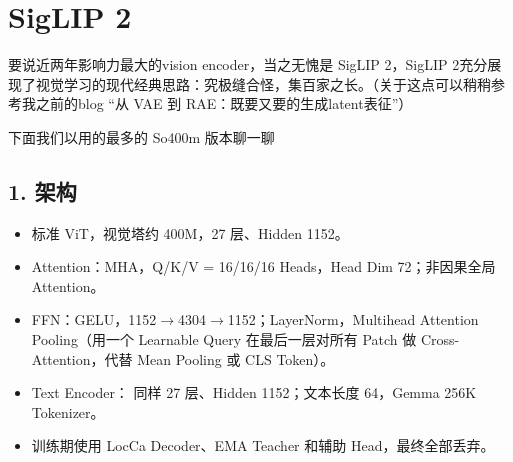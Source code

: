 \clearpage
{}
\setlength{\paperwidth}{210mm}
\setlength{\paperheight}{297mm}
\setlength{\pdfpagewidth}{210mm}
\setlength{\pdfpageheight}{297mm}
\fancyhfoffset{0pt}
\linespread{1.10}\normalsize
\setlength{\parskip}{0.26em}
\setlength{\emergencystretch}{2em}
\setlength{\abovedisplayskip}{7pt plus 2pt minus 2pt}
\setlength{\belowdisplayskip}{7pt plus 2pt minus 2pt}

\section{SigLIP 2}
要说近两年影响力最大的vision encoder，当之无愧是 SigLIP 2，SigLIP 2充分展现了视觉学习的现代经典思路：究极缝合怪，集百家之长。（关于这点可以稍稍参考我之前的blog “从 VAE 到 RAE：既要又要的生成latent表征”）\par
下面我们以用的最多的 So400m 版本聊一聊\par
{}
\subsection{1.\allowbreak{} 架构}
\begin{itemize}
\item 标准 ViT，视觉塔约 400M，27 层、Hidden 1152。
\item Attention：MHA，Q/\allowbreak{}K/\allowbreak{}V =\allowbreak{} 16/\allowbreak{}16/\allowbreak{}16 Heads，Head Dim 72；非因果全局 Attention。
\item FFN：GELU，1152\(\rightarrow\)4304\(\rightarrow\)1152；LayerNorm，Multihead Attention Pooling（用一个 Learnable Query 在最后一层对所有 Patch 做 Cross-\allowbreak{}Attention，代替 Mean Pooling 或 CLS Token）。
\item Text Encoder： 同样 27 层、Hidden 1152；文本长度 64，Gemma 256K Tokenizer。
\item 训练期使用 LocCa Decoder、EMA Teacher 和辅助 Head，最终全部丢弃。
\end{itemize}
